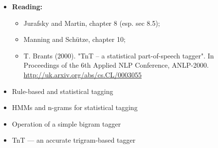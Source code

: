 \begin{frame}

  \begin{itemize}
  \item \textbf{Reading:} 
    \begin{itemize}
    \item Jurafsky and Martin, chapter 8 (esp. sec
    8.5); 
  \item  Manning and Sch\"utze, chapter 10; 
  \item T. Brants (2000). "TnT -- a statistical part-of-speech
      tagger". In
    Proceedings of the 6th Applied NLP Conference, ANLP-2000.\\
    \href{http://uk.arxiv.org/abs/cs.CL/0003055}{http://uk.arxiv.org/abs/cs.CL/0003055}
  \end{itemize}
  \item Rule-based and statistical tagging
  \item HMMs and n-grams for statistical tagging
  \item Operation of a simple bigram tagger
  \item TnT --- an accurate trigram-based tagger
  \end{itemize}
\end{frame}






















































